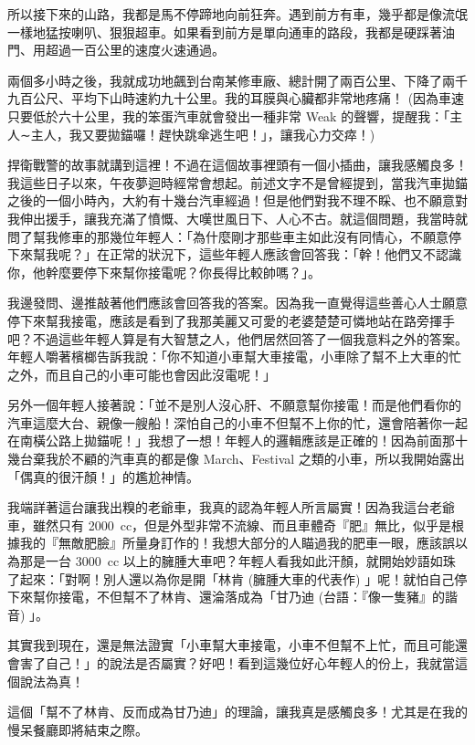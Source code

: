 所以接下來的山路，我都是馬不停蹄地向前狂奔。遇到前方有車，幾乎都是像流氓一樣地猛按喇叭、狠狠超車。如果看到前方是單向通車的路段，我都是硬踩著油門、用超過一百公里的速度火速通過。

兩個多小時之後，我就成功地飆到台南某修車廠、總計開了兩百公里、下降了兩千九百公尺、平均下山時速約九十公里。我的耳膜與心臟都非常地疼痛！ (因為車速只要低於六十公里，我的笨蛋汽車就會發出一種非常 Weak 的聲響，提醒我：「主人∼主人，我又要拋錨囉！趕快跳傘逃生吧！」，讓我心力交瘁！) 

捍衛戰警的故事就講到這裡！不過在這個故事裡頭有一個小插曲，讓我感觸良多！我這些日子以來，午夜夢迴時經常會想起。前述文字不是曾經提到，當我汽車拋錨之後的一個小時內，大約有十幾台汽車經過！但是他們對我不理不睬、也不願意對我伸出援手，讓我充滿了憤慨、大嘆世風日下、人心不古。就這個問題，我當時就問了幫我修車的那幾位年輕人：「為什麼剛才那些車主如此沒有同情心，不願意停下來幫我呢？」在正常的狀況下，這些年輕人應該會回答我：「幹！他們又不認識你，他幹麼要停下來幫你接電呢？你長得比較帥嗎？」。

我邊發問、邊推敲著他們應該會回答我的答案。因為我一直覺得這些善心人士願意停下來幫我接電，應該是看到了我那美麗又可愛的老婆楚楚可憐地站在路旁揮手吧？不過這些年輕人算是有大智慧之人，他們居然回答了一個我意料之外的答案。年輕人嚼著檳榔告訴我說：「你不知道小車幫大車接電，小車除了幫不上大車的忙之外，而且自己的小車可能也會因此沒電呢！」

另外一個年輕人接著說：「並不是別人沒心肝、不願意幫你接電！而是他們看你的汽車這麼大台、親像一艘船！深怕自己的小車不但幫不上你的忙，還會陪著你一起在南橫公路上拋錨呢！」我想了一想！年輕人的邏輯應該是正確的！因為前面那十幾台棄我於不顧的汽車真的都是像 March、Festival 之類的小車，所以我開始露出「偶真的很汗顏！」的尷尬神情。

我端詳著這台讓我出糗的老爺車，我真的認為年輕人所言屬實！因為我這台老爺車，雖然只有 2000~cc，但是外型非常不流線、而且車體奇『肥』無比，似乎是根據我的『無敵肥臉』所量身訂作的！我想大部分的人瞄過我的肥車一眼，應該誤以為那是一台 3000~cc 以上的臃腫大車吧？年輕人看我如此汗顏，就開始妙語如珠了起來：「對啊！別人還以為你是開「林肯 (臃腫大車的代表作) 」呢！就怕自己停下來幫你接電，不但幫不了林肯、還淪落成為「甘乃迪 (台語：『像一隻豬』的諧音) 」。

其實我到現在，還是無法證實「小車幫大車接電，小車不但幫不上忙，而且可能還會害了自己！」的說法是否屬實？好吧！看到這幾位好心年輕人的份上，我就當這個說法為真！

這個「幫不了林肯、反而成為甘乃迪」的理論，讓我真是感觸良多！尤其是在我的慢呆餐廳即將結束之際。

